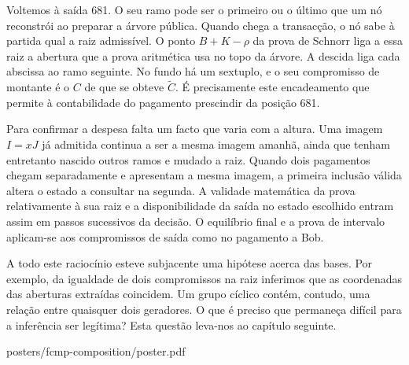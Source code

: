 Voltemos à saída 681. O seu ramo pode ser o primeiro ou o último
que um nó reconstrói ao preparar a árvore pública. Quando chega a
transacção, o nó sabe à partida qual a raiz admissível. O ponto
\(B+K-\rho\) da prova de Schnorr liga a essa raiz a abertura que
a prova aritmética usa no topo da árvore. A descida liga cada
abscissa ao ramo seguinte. No fundo há um sextuplo, e o seu compromisso
de montante é o \(C\) de que se obteve \(\widetilde C\).
É precisamente este encadeamento que permite à contabilidade do
pagamento prescindir da posição 681.

Para confirmar a despesa falta um facto que varia com a altura.
Uma imagem \(I=xJ\) já admitida continua a ser a mesma imagem amanhã,
ainda que tenham entretanto nascido outros ramos e mudado a raiz.
Quando dois pagamentos chegam separadamente e apresentam a mesma
imagem, a primeira inclusão válida altera o estado a consultar na
segunda. A validade matemática da prova relativamente à sua raiz
e a disponibilidade da saída no estado escolhido entram assim em
passos sucessivos da decisão. O equilíbrio final e a prova de
intervalo aplicam-se aos compromissos de saída como no pagamento a Bob.

A todo este raciocínio esteve subjacente uma hipótese acerca das
bases. Por exemplo, da igualdade de dois compromissos na raiz
inferimos que as coordenadas das aberturas extraídas coincidem.
Um grupo cíclico contém, contudo, uma relação entre quaisquer dois
geradores. O que é preciso que permaneça difícil para a inferência
ser legítima? Esta questão leva-nos ao capítulo seguinte.

\label{page:fcmp-text-end}

  {posters/fcmp-composition/poster.pdf}
